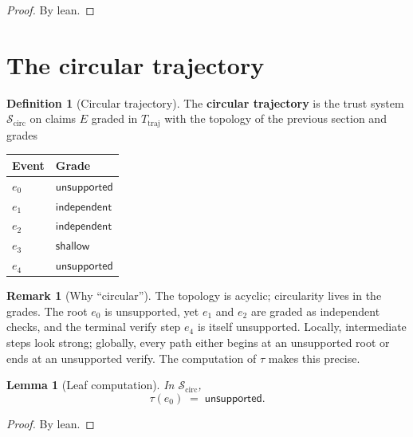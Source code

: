 \documentclass[11pt,a4paper]{article}
\theoremstyle{plain}
\newtheorem{lemma}[theorem]{Lemma}
\theoremstyle{definition}
\newtheorem{definition}[theorem]{Definition}
\newtheorem{remark}[theorem]{Remark}
\newcommand{\tauu}{\tau}
\begin{document}
\begin{proof}
By lean.
\end{proof}

\section{The circular trajectory}

\begin{definition}[Circular trajectory]\label{def:circular}
The \textbf{circular trajectory} is the trust system
$\mathcal{S}_{\mathrm{circ}}$ on claims $E$ graded in $T_{\mathrm{traj}}$
with the topology of the previous section and grades
\begin{center}
\begin{tabular}{ll}
\hline
Event & Grade \\
\hline
$e_0$ & $\mathsf{unsupported}$ \\
$e_1$ & $\mathsf{independent}$ \\
$e_2$ & $\mathsf{independent}$ \\
$e_3$ & $\mathsf{shallow}$ \\
$e_4$ & $\mathsf{unsupported}$ \\
\hline
\end{tabular}
\end{center}
\end{definition}

\begin{remark}[Why ``circular'']
The topology is acyclic; circularity lives in the grades. The root $e_0$ is
unsupported, yet $e_1$ and $e_2$ are graded as independent checks, and the
terminal verify step $e_4$ is itself unsupported. Locally, intermediate
steps look strong; globally, every path either begins at an unsupported
root or ends at an unsupported verify. The computation of $\tauu$ makes this
precise.
\end{remark}

\begin{lemma}[Leaf computation]\label{lem:circ-e0}
In $\mathcal{S}_{\mathrm{circ}}$,
\begin{equation}
  \tauu(e_0) \;=\; \mathsf{unsupported}.
\end{equation}
\end{lemma}

\begin{proof}
By lean.
\end{proof}
\end{document}
